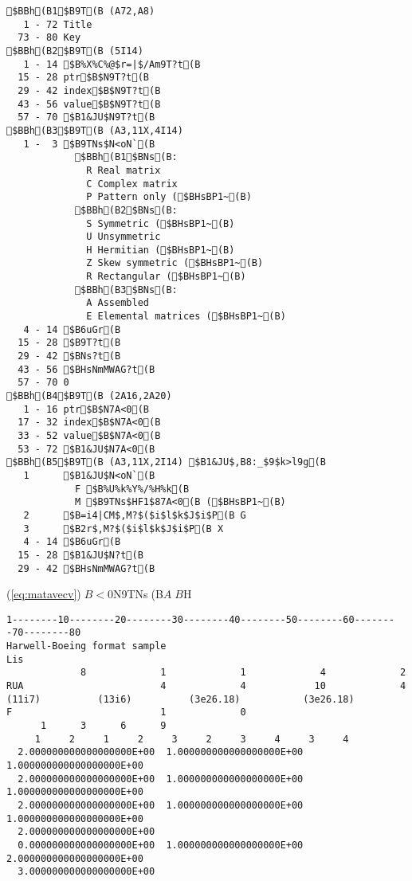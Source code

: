 \documentclass[a4paper]{jarticle}
\begin{document}
{{{\small
\begin{verbatim}
$BBh(B1$B9T(B (A72,A8)
   1 - 72 Title
  73 - 80 Key
$BBh(B2$B9T(B (5I14)
   1 - 14 $B%X%C%@$r=|$/Am9T?t(B
  15 - 28 ptr$B$N9T?t(B
  29 - 42 index$B$N9T?t(B
  43 - 56 value$B$N9T?t(B
  57 - 70 $B1&JU$N9T?t(B
$BBh(B3$B9T(B (A3,11X,4I14)
   1 -  3 $B9TNs$N<oN`(B
            $BBh(B1$BNs(B: 
              R Real matrix
              C Complex matrix
              P Pattern only ($BHsBP1~(B)
            $BBh(B2$BNs(B: 
              S Symmetric ($BHsBP1~(B)
              U Unsymmetric
              H Hermitian ($BHsBP1~(B)
              Z Skew symmetric ($BHsBP1~(B)
              R Rectangular ($BHsBP1~(B)
            $BBh(B3$BNs(B: 
              A Assembled
              E Elemental matrices ($BHsBP1~(B)
   4 - 14 $B6uGr(B
  15 - 28 $B9T?t(B
  29 - 42 $BNs?t(B
  43 - 56 $BHsNmMWAG?t(B
  57 - 70 0
$BBh(B4$B9T(B (2A16,2A20)
   1 - 16 ptr$B$N7A<0(B
  17 - 32 index$B$N7A<0(B
  33 - 52 value$B$N7A<0(B
  53 - 72 $B1&JU$N7A<0(B
$BBh(B5$B9T(B (A3,11X,2I14) $B1&JU$,B8:_$9$k>l9g(B
   1      $B1&JU$N<oN`(B
            F $B%U%k%Y%/%H%k(B
            M $B9TNs$HF1$87A<0(B ($BHsBP1~(B)
   2      $B=i4|CM$,M?$($i$l$k$J$i$P(B G
   3      $B2r$,M?$($i$l$k$J$i$P(B X
   4 - 14 $B6uGr(B
  15 - 28 $B1&JU$N?t(B
  29 - 42 $BHsNmMWAG?t(B
\end{verbatim}
}

(\ref{eq:matavecv})$B<0$N9TNs(B$A$$B$H%

{\small
\begin{verbatim}
1--------10--------20--------30--------40--------50--------60--------70--------80
Harwell-Boeing format sample                                            Lis
             8             1             1             4             2
RUA                        4             4            10             4
(11i7)          (13i6)          (3e26.18)           (3e26.18)
F                          1             0
      1      3      6      9
     1     2     1     2     3     2     3     4     3     4
  2.000000000000000000E+00  1.000000000000000000E+00  1.000000000000000000E+00
  2.000000000000000000E+00  1.000000000000000000E+00  1.000000000000000000E+00
  2.000000000000000000E+00  1.000000000000000000E+00  1.000000000000000000E+00
  2.000000000000000000E+00
  0.000000000000000000E+00  1.000000000000000000E+00  2.000000000000000000E+00
  3.000000000000000000E+00
\end{verbatim}
}

}}
\end{document}
